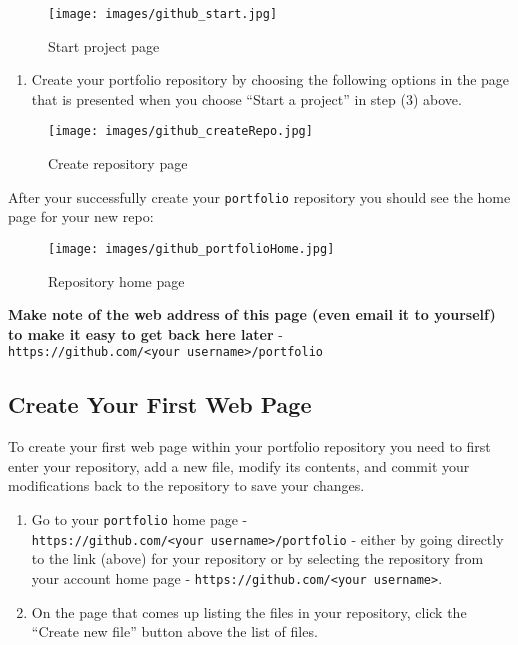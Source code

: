 \documentclass[]{book}
\providecommand{\tightlist}{%
  \setlength{\itemsep}{0pt}\setlength{\parskip}{0pt}}
\begin{document}
\begin{figure}[htbp]
\centering
\texttt{[image: images/github\_start.jpg]}
\caption{Start project page}
\end{figure}

\begin{enumerate}
\def\labelenumi{\arabic{enumi}.}
\setcounter{enumi}{3}
\tightlist
\item
  Create your portfolio repository by choosing the following options in
  the page that is presented when you choose ``Start a project'' in step
  (3) above.
\end{enumerate}

\begin{figure}[htbp]
\centering
\texttt{[image: images/github\_createRepo.jpg]}
\caption{Create repository page}
\end{figure}

After your successfully create your \texttt{portfolio} repository you
should see the home page for your new repo:

\begin{figure}[htbp]
\centering
\texttt{[image: images/github\_portfolioHome.jpg]}
\caption{Repository home page}
\end{figure}

\textbf{Make note of the web address of this page (even email it to
yourself) to make it easy to get back here later} -
\texttt{https://github.com/\textless{}your\ username\textgreater{}/portfolio}

\subsection{Create Your First Web
Page}\label{create-your-first-web-page}

To create your first web page within your portfolio repository you need
to first enter your repository, add a new file, modify its contents, and
commit your modifications back to the repository to save your changes.

\begin{enumerate}
\def\labelenumi{\arabic{enumi}.}
\item
  Go to your \texttt{portfolio} home page -
  \texttt{https://github.com/\textless{}your\ username\textgreater{}/portfolio}
  - either by going directly to the link (above) for your repository or
  by selecting the repository from your account home page -
  \texttt{https://github.com/\textless{}your\ username\textgreater{}}.
\item
  On the page that comes up listing the files in your repository, click
  the ``Create new file'' button above the list of files.
\end{enumerate}
\end{document}
